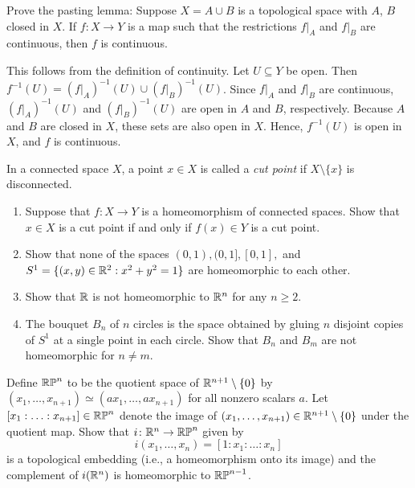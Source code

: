 \documentclass[12pt]{article}
\begin{document}
% 


\begin{problab}{1}
Prove the pasting lemma: Suppose $X = A \cup B$ is a topological space with $A$, $B$ closed in $X$. If $f \colon X \to Y$ is a map such that the restrictions $f|_A$ and $f|_B$ are continuous, then $f$ is continuous. 
\end{problab}
\begin{solu}
    This follows from the definition of continuity. Let $U \subseteq Y$ be open. Then $f^{-1}(U) = (f|_A)^{-1}(U) \cup (f|_B)^{-1}(U)$. Since $f|_A$ and $f|_B$ are continuous, $(f|_A)^{-1}(U)$ and $(f|_B)^{-1}(U)$ are open in $A$ and $B$, respectively. Because $A$ and $B$ are closed in $X$, these sets are also open in $X$. Hence, $f^{-1}(U)$ is open in $X$, and $f$ is continuous.
\end{solu}
\newpage

\begin{problab}{2}
In a connected space $X$, a point $x \in X$ is called a \emph{cut point} if $X \setminus \{ x \}$ is disconnected. 
    \begin{enumerate}
        \item Suppose that $f: X \to Y$ is a homeomorphism of connected spaces. Show that $x \in X$ is a cut point if and only if $f(x) \in Y$ is a cut point. 
        \item Show that none of the spaces $(0,1), (0,1], [0,1],$ and $S^1 = \{ (x,y) \in \mathbb R^2 : x^2 + y^2 =1 \} $ are homeomorphic to each other. 
        \item Show that $\mathbb R$ is not homeomorphic to $\mathbb R^n$ for any $n \geq 2$. 
        \item The bouquet $B_n$ of $n$ circles is the space obtained by gluing $n$ disjoint copies of $S^1$ at a single point in each circle. Show that $B_n$ and $B_m$ are not homeomorphic for $n \neq m$. 
    \end{enumerate}
\end{problab}
\begin{solu}

\end{solu}
\newpage

\begin{problab}{3}
Define $\mathbb{RP}^n$ to be the quotient space of $\mathbb R^{n+1}\setminus \{0\}$ by $(x_1, \hdots, x_{n+1}) \simeq (a x_1, \hdots, a x_{n+1})$ for all nonzero scalars $a$. Let $[x_1: \hdots : x_{n+1}] \in \mathbb{RP}^n$ denote the image of $(x_1, \hdots, x_{n+1}) \in \mathbb{R}^{n+1} \setminus \{ 0 \}$ under the quotient map. Show that $i \colon \mathbb{R}^n \to \mathbb{RP}^n$ given by 
$$ i (x_1, \hdots, x_n) = [1: x_1 : \hdots : x_n ] $$
is a topological embedding (i.e., a homeomorphism onto its image) and the complement of $i(\mathbb{R}^n)$ is homeomorphic to $\mathbb{RP}^{n-1}$.
\end{problab}
\end{document}

